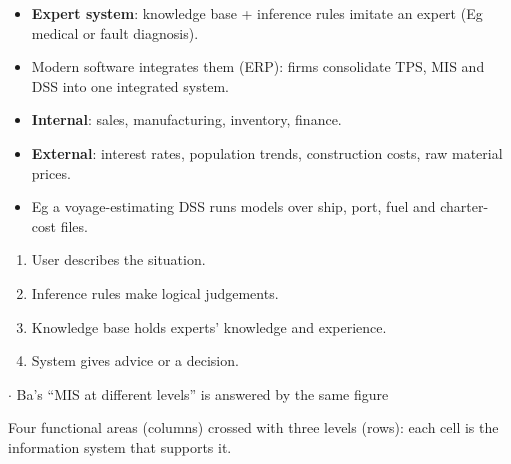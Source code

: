 {\begin{itemize}
  \item \textbf{Expert system}: knowledge base + inference rules imitate an expert (Eg
    medical or fault diagnosis).
  \item Modern software integrates them (ERP): firms consolidate TPS, MIS and DSS into one
    integrated system.
\end{itemize}
\begin{itemize}
  \item \textbf{Internal}: sales, manufacturing, inventory, finance.
  \item \textbf{External}: interest rates, population trends, construction costs, raw
    material prices.
  \item Eg a voyage-estimating DSS runs models over ship, port, fuel and charter-cost files.
\end{itemize}
\begin{enumerate}
  \item User describes the situation.
  \item Inference rules make logical judgements.
  \item Knowledge base holds experts' knowledge and experience.
  \item System gives advice or a decision.
\end{enumerate}}

\par{}
{\color{sub}\footnotesize {}  \gap$\cdot$ Ba's ``MIS at different levels'' is answered by the same figure}

{\color{sub}\scriptsize Four functional areas (columns) crossed with three levels (rows): each cell
is the information system that supports it.}

